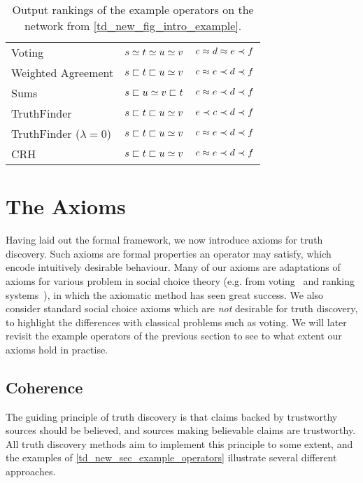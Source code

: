 \begin{table}
    \centering
	\caption{Output rankings of the example operators on the network from
    \cref{td_new_fig_intro_example}.}
	\begin{tabular}{lcc}
    \toprule
    Voting             & $s \simeq t \simeq u \simeq v$ & $c \approx d \approx e \prec f$ \\
    Weighted Agreement & $s \sqsubset t \sqsubset u \simeq v$ & $c \approx e \prec d \prec f$ \\
    Sums               & $s \sqsubset u \simeq v \sqsubset t$ & $c \approx e \prec d \prec f$ \\
    TruthFinder        & $s \sqsubset t \sqsubset u \simeq v$ & $e \prec c \prec d \prec f$ \\
    TruthFinder ($\lambda = 0$) & $s \sqsubset t \sqsubset u \simeq v$ & $c \approx e \prec d \prec f$ \\
    CRH                & $s \sqsubset t \sqsubset u \simeq v$ & $c \approx e \prec d \prec f$ \\
    \bottomrule
	\end{tabular}
    \label{td_new_tab_example_outputs}
\end{table}

\section{The Axioms}
\label{td_new_sec_axioms}

Having laid out the formal framework, we now introduce axioms for truth
discovery. Such axioms are formal properties an operator may satisfy, which
encode intuitively desirable behaviour. Many of our axioms are adaptations of
axioms for various problem in social choice theory (e.g. from
voting~\cite{zwicker2016voting} and ranking systems~\cite{altman2008}), in
which the axiomatic method has seen great success. We also consider standard
social choice axioms which are \emph{not} desirable for truth discovery, to
highlight the differences with classical problems such as voting. We will later
revisit the example operators of the previous section to see to what extent our
axioms hold in practise.

\subsection{Coherence}

The guiding principle of truth discovery is that claims backed by trustworthy
sources should be believed, and sources making believable claims are
trustworthy. All truth discovery methods aim to implement this principle to
some extent, and the examples of \cref{td_new_sec_example_operators} illustrate
several different approaches.

